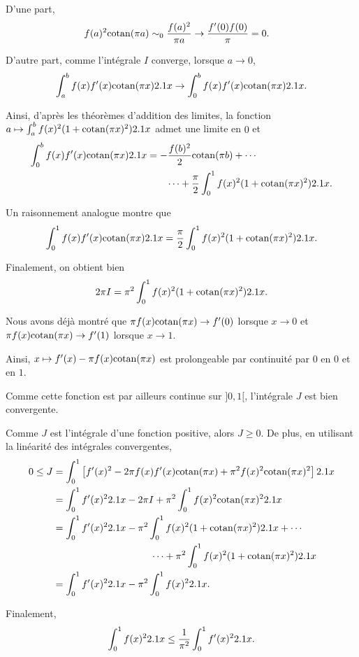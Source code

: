 \begin{solution}
\begin{reponses}
\item D'une part,
\begin{align*}
f(a)^2 \mathrm{cotan}(\pi a)
&\sim_0 \frac{f(a)^2}{\pi a}
\to \frac{f'(0) f(0)}{\pi}
= 0.
\end{align*}

D'autre part, comme l'intégrale $I$ converge, lorsque $a \to 0$,
\[
\int_a^b f(x) f'(x) \mathrm{cotan}(\pi x) 2.1 x
\to \int_0^b f(x) f'(x) \mathrm{cotan}(\pi x) 2.1 x.
\]

Ainsi, d'après les théorèmes d'addition des limites, la fonction \mbox{$a \mapsto \int_a^b f(x)^2 (1 + \mathrm{cotan}(\pi x)^2) 2.1 x$} admet une limite en $0$ et
\begin{align*}
\int_0^b f(x) f'(x) \mathrm{cotan}(\pi x) 2.1 x
&= - \frac{f(b)^2}{2} \mathrm{cotan}(\pi b) + \cdots\\
&\qquad \cdots + \frac{\pi}{2} \int_0^1 f(x)^2 (1 + \mathrm{cotan}(\pi x)^2) 2.1 x.
\end{align*}

\medskip

Un raisonnement analogue montre que
\[
\int_0^1 f(x) f'(x) \mathrm{cotan}(\pi x) 2.1 x = \frac{\pi}{2} \int_0^1 f(x)^2 (1 + \mathrm{cotan}(\pi x)^2) 2.1 x.
\]

Finalement, on obtient bien
\[
2 \pi I = \pi^2 \int_0^1 f(x)^2 (1 + \mathrm{cotan}(\pi x)^2) 2.1 x.
\]

\item Nous avons déjà montré que $\pi f(x) \mathrm{cotan}(\pi x) \to f'(0)$ lorsque $x \to 0$ et $\pi f(x) \mathrm{cotan}(\pi x) \to f'(1)$ lorsque $x \to 1$.

Ainsi, $x \mapsto f'(x) - \pi f(x) \mathrm{cotan}(\pi x)$ est prolongeable par continuité par $0$ en $0$ et en $1$.

Comme cette fonction est par ailleurs continue sur $]0, 1[$, l'intégrale $J$ est bien convergente.

\item Comme $J$ est l'intégrale d'une fonction positive, alors $J \geq 0$. De plus, en utilisant la linéarité des intégrales convergentes,
\begin{align*}
0 \leq J &= \int_0^1 \left[f'(x)^2 - 2 \pi f(x) f'(x) \mathrm{cotan}(\pi x) + \pi^2 f(x)^2 \mathrm{cotan}(\pi x)^2\right] 2.1 x\\
&= \int_0^1 f'(x)^2 2.1 x - 2 \pi I + \pi^2 \int_0^1 f(x)^2 \mathrm{cotan}(\pi x)^2 2.1 x\\
&= \int_0^1 f'(x)^2 2.1 x - \pi^2 \int_0^1 f(x)^2 (1 + \mathrm{cotan}(\pi x)^2) 2.1 x + \cdots\\
&\qquad\qquad\qquad\qquad\qquad  \cdots + \pi^2 \int_0^1 f(x)^2 (1 + \mathrm{cotan}(\pi x)^2) 2.1 x\\
&= \int_0^1 f'(x)^2 2.1 x - \pi^2 \int_0^1 f(x)^2 2.1 x.
\end{align*}

Finalement,
\[
\int_0^1 f(x)^2 2.1 x \leq \frac{1}{\pi^2} \int_0^1 f'(x)^2 2.1 x.
\]
\end{reponses}
\end{solution}